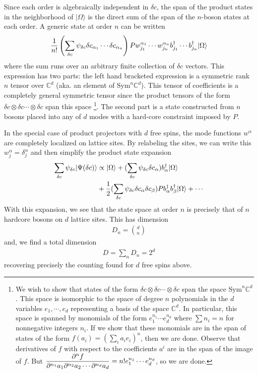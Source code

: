 \documentclass[aps,pra,twocolumn,superscriptaddress,amsmath]{revtex4-1}
\newcommand{\ket}[1]{|#1\rangle}
\newcommand{\f}[2]{{\ensuremath{\mathchoice%
       {\dfrac{#1}{#2}}
       {\dfrac{#1}{#2}}
       {\frac{#1}{#2}}
       {\frac{#1}{#2}}
       }}}
\begin{document}
Since each order is algebraically independent in $\delta c$, the span of the product states in the neighborhood of $\ket{\Omega}$ is the direct sum of the span of the $n$-boson states at each order. A generic state at order $n$ can be written
\begin{align}
	\f{1}{n!} \left( \sum_{\delta c} \psi_{\delta c} \delta c_{\alpha_1} \cdots \delta c_{\alpha_n}\right) P w^{\alpha_1}_{j_1} \cdots w^{\alpha_n}_{j_n} b^\dagger_{j_1}\cdots b^\dagger_{j_n} \ket{\Omega}
\end{align}
where the sum runs over an arbitrary finite collection of $\delta c$ vectors.
This expression has two parts: the left hand bracketed expression is a symmetric rank $n$ tensor over $\mathbb{C}^d$ (aka. an element of $\mathrm{Sym}^n \mathbb{C}^d$). This tensor of coefficients is a completely general symmetric tensor since the product tensors of the form $\delta c \otimes \delta c \cdots \otimes \delta c$ span this space 
\footnote{
We wish to show that states of the form $\delta c \otimes \delta c \cdots \otimes \delta c$ span the space $\mathrm{Sym}^n \mathbb{C}^d$. This space
is isomorphic to the space of degree $n$ polynomials in the $d$ variables $e_1,\cdots,e_d$ representing a basis of the space $\mathbb{C}^d$. In particular, this space is spanned by monomials of the form $e_1^{n_1}\cdots e_d^{n_d}$ where $\sum n_i = n$ for nonnegative integers $n_i$. 
If we show that these monomials are in the span of states of the form $f(a_i) = (\sum_i a_i e_i)^n$, then we are done. Observe that derivatives of $f$ with respect to the coefficients $a^i$ are in the span of the image of $f$. But $\f{\partial^n f}{\partial^{n_1} a_1 \partial^{n_2} a_2\cdots\partial^{n_d}a_d} = n! e_1^{n_1}\cdots e_d^{n_d}$, so we are done.
}.
The second part is a state constructed from $n$ bosons placed into any of $d$ modes with a hard-core constraint imposed by $P$. 

In the special case of product projectors with $d$ free spins, the mode functions $w^\alpha$ are completely localized on lattice sites. By relabeling the sites, we can write this $w^\alpha_j = \delta^\alpha_j$ and then simplify the product state expansion
\begin{align}
	\sum_{\delta c} \psi_{\delta c} \ket{\Psi(\delta c)} &\propto \ket{\Omega} + (\sum_{\delta c} \psi_{\delta c}\delta c_\alpha)  b^\dagger_\alpha \ket{\Omega} \\
	&+ \f{1}{2} (\sum_{\delta c} \psi_{\delta c} \delta c_\alpha \delta c_\beta) P b^\dagger_\alpha b^\dagger_\beta \ket{\Omega} + \cdots
\end{align}
With this expansion, we see that the state space at order $n$ is precisely that of $n$ hardcore bosons on $d$ lattice sites. This has dimension
\begin{align}
	D_n = \binom{d}{n}
\end{align}
and, we find a total dimension
\begin{align}
	D = \sum_n D_n = 2^d
\end{align}
recovering precisely the counting found for $d$ free spins above.
\end{document}
